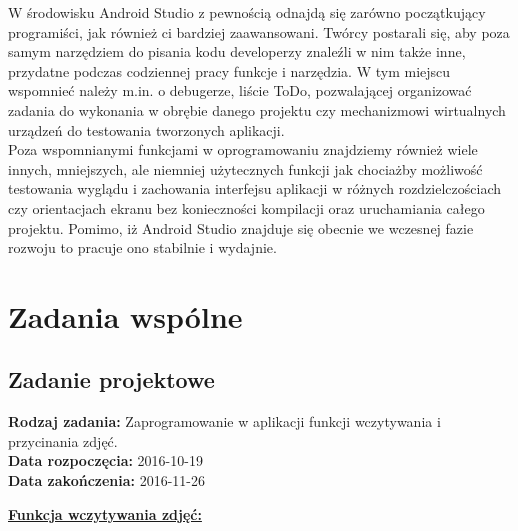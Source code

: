 W środowisku Android Studio z pewnością odnajdą się zarówno początkujący programiści, jak również ci bardziej zaawansowani. Twórcy postarali się, aby poza samym narzędziem do pisania kodu developerzy znaleźli w nim także inne, przydatne podczas codziennej pracy funkcje i narzędzia. W tym miejscu wspomnieć należy m.in. o debugerze, liście ToDo, pozwalającej organizować zadania do wykonania w obrębie danego projektu czy mechanizmowi wirtualnych urządzeń do testowania tworzonych aplikacji.\\

Poza wspomnianymi funkcjami w oprogramowaniu znajdziemy również wiele innych, mniejszych, ale niemniej użytecznych funkcji jak chociażby możliwość testowania wyglądu i zachowania interfejsu aplikacji w różnych rozdzielczościach czy orientacjach ekranu bez konieczności kompilacji oraz uruchamiania całego projektu. Pomimo, iż Android Studio znajduje się obecnie we wczesnej fazie rozwoju to pracuje ono stabilnie i wydajnie.

\chapter{Zadania wspólne}

\section{Zadanie projektowe}
\noindent\textbf{Rodzaj zadania:}  Zaprogramowanie w aplikacji funkcji wczytywania i przycinania zdjęć.\\

\noindent\textbf{Data rozpoczęcia:} 2016-10-19\\

\noindent\textbf{Data zakończenia:} 2016-11-26\\

\begin{center}
\underline{\textbf{Funkcja wczytywania zdjęć:}}
\end{center}

